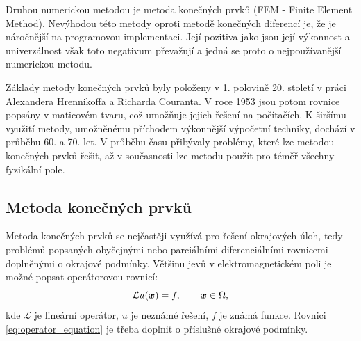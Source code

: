 \documentclass[12pt,a4paper,oneside]{article}
\numberwithin{equation}{section} %
\numberwithin{figure}{section} %
\numberwithin{table}{section} %
\renewcommand{\vec}[1]{\mbox{\boldmath$#1$}} %
\begin{document}
Druhou numerickou metodou je metoda konečných prvků (FEM - Finite Element Method). Nevýhodou této metody oproti metodě konečných diferencí je, že je náročnější na programovou implementaci. Její pozitiva jako jsou její výkonnost a univerzálnost však toto negativum převažují a jedná se proto o nejpoužívanější numerickou metodu. 

Základy metody konečných prvků byly položeny v 1. polovině 20. století v práci Alexandera Hrennikoffa a Richarda Couranta. V roce 1953 jsou potom rovnice popsány v maticovém tvaru, což umožňuje jejich řešení na počítačích. K širšímu využití metody, umožněnému příchodem výkonnější výpočetní techniky, dochází v průběhu 60. a 70. let. V průběhu času přibývaly problémy, které lze metodou konečných prvků řešit, až v současnosti lze metodu použít pro téměř všechny fyzikální pole. \cite{FEM}


\subsection{Metoda konečných prvků}
\label{FEM}
Metoda konečných prvků se nejčastěji využívá pro řešení okrajových úloh, tedy problémů popsaných  obyčejnými nebo parciálními diferenciálními rovnicemi doplněnými o okrajové podmínky.
Většinu jevů v elektromagnetickém poli je možné popsat operátorovou rovnicí:
\begin{equation}
\mathcal{L}u(\vec{x}) = f,  \qquad \vec{x} \in \Omega,
\label{eq:operator_equation}
\end{equation} 
kde $\mathcal{L}$ je lineární operátor, $u$ je neznámé řešení, $f$ je známá funkce. Rovnici \ref{eq:operator_equation} je třeba doplnit o příslušné okrajové podmínky.
\end{document}

